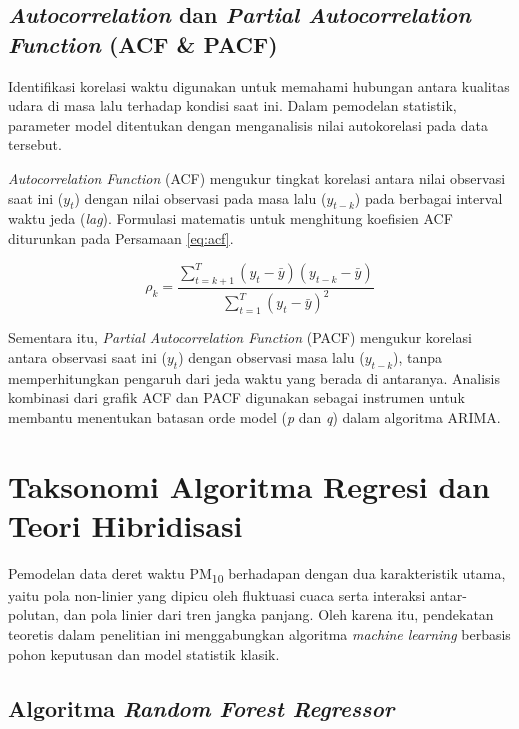 \subsection{\textit{Autocorrelation} dan \textit{Partial Autocorrelation Function} (ACF \& PACF)}

Identifikasi korelasi waktu digunakan untuk memahami hubungan antara kualitas udara di masa lalu terhadap kondisi saat ini. Dalam pemodelan statistik, parameter model ditentukan dengan menganalisis nilai autokorelasi pada data tersebut. 

\textit{Autocorrelation Function} (ACF) mengukur tingkat korelasi antara nilai observasi saat ini ($y_t$) dengan nilai observasi pada masa lalu ($y_{t-k}$) pada berbagai interval waktu jeda (\textit{lag}). Formulasi matematis untuk menghitung koefisien ACF diturunkan pada Persamaan \ref{eq:acf}.

\begin{equation}
\rho_k = \frac{\sum_{t=k+1}^T (y_t - \bar{y})(y_{t-k} - \bar{y})}{\sum_{t=1}^T (y_t - \bar{y})^2}
\label{eq:acf}
\end{equation}

Sementara itu, \textit{Partial Autocorrelation Function} (PACF) mengukur korelasi antara observasi saat ini ($y_t$) dengan observasi masa lalu ($y_{t-k}$), tanpa memperhitungkan pengaruh dari jeda waktu yang berada di antaranya. Analisis kombinasi dari grafik ACF dan PACF digunakan sebagai instrumen untuk membantu menentukan batasan orde model (\textit{p} dan \textit{q}) dalam algoritma ARIMA.

\section{Taksonomi Algoritma Regresi dan Teori Hibridisasi}

Pemodelan data deret waktu PM\textsubscript{10} berhadapan dengan dua karakteristik utama, yaitu pola non-linier yang dipicu oleh fluktuasi cuaca serta interaksi antar-polutan, dan pola linier dari tren jangka panjang. Oleh karena itu, pendekatan teoretis dalam penelitian ini menggabungkan algoritma \textit{machine learning} berbasis pohon keputusan dan model statistik klasik.

\subsection{Algoritma \textit{Random Forest Regressor}}

